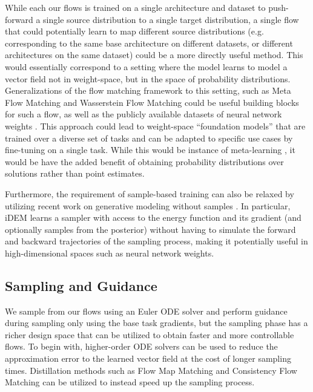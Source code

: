 While each our flows is trained on a single architecture and dataset to push-forward a single source distribution to a single target distribution, a single flow that could potentially learn to map different source distributions (e.g. corresponding to the same base architecture on different datasets, or different architectures on the same dataset) could be a more directly useful method. This would essentially correspond to a setting where the model learns to model a vector field not in weight-space, but in the space of probability distributions. Generalizations of the flow matching framework to this setting, such as Meta Flow Matching \citep{atanackovicMetaFlowMatching2024a} and Wasserstein Flow Matching \citep{havivWassersteinFlowMatching2024} could be useful building blocks for such a flow, as well as the publicly available datasets of neural network weights \citep{schurholtModelZoosDataset2022}. This approach could lead to weight-space ``foundation models'' that are trained over a diverse set of tasks and can be adapted to specific use cases by fine-tuning on a single task. While this would be instance of meta-learning \citep{hospedalesMetaLearningNeuralNetworks2022}, it would be have the added benefit of obtaining probability distributions over solutions rather than point estimates. 

Furthermore, the requirement of sample-based training can also be relaxed by utilizing recent work on generative modeling without samples \citep{vargasTransportMeetsVariational2023,akhound-sadeghIteratedDenoisingEnergy2024}. In particular, iDEM \citep{akhound-sadeghIteratedDenoisingEnergy2024} learns a sampler with access to the energy function and its gradient (and optionally samples from the posterior) without having to simulate the forward and backward trajectories of the sampling process, making it potentially useful in high-dimensional spaces such as neural network weights. 

\subsection{Sampling and Guidance}

We sample from our flows using an Euler ODE solver and perform guidance during sampling only using the base task gradients, but the sampling phase has a richer design space that can be utilized to obtain faster and more controllable flows. To begin with, higher-order ODE solvers can be used to reduce the approximation error to the learned vector field at the cost of longer sampling times. Distillation methods such as Flow Map Matching \citep{boffiFlowMapMatching2024} and Consistency Flow Matching \citep{yangConsistencyFlowMatching2024} can be utilized to instead speed up the sampling process.  

